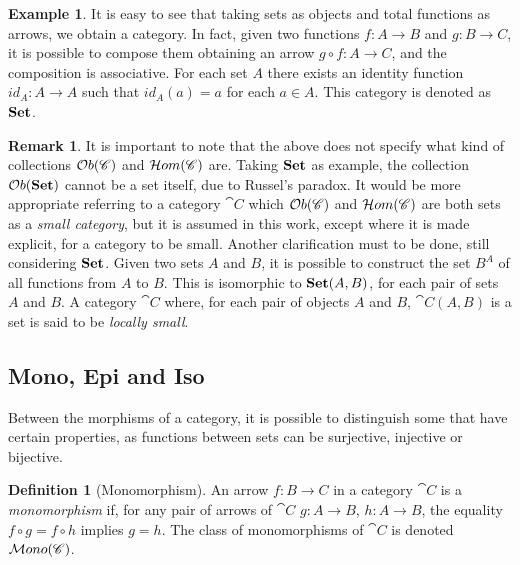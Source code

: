 \documentclass[a4paper, twoside,openright]{report}
\theoremstyle{plain}
\theoremstyle{definition}
\newtheorem{definition}[theorem]{Definition}
\newtheorem{example}[theorem]{Example}
\newtheorem{remark}[theorem]{Remark}
\begin{document}
\begin{example}
    It is easy to see that taking sets as objects and total functions as arrows, we obtain a category. In fact, given two functions $f: A \rightarrow B$ and $g: B \rightarrow C$, it is possible to compose them obtaining an arrow $g \circ f : A \rightarrow C$, and the composition is associative. For each set $A$ there exists an identity function $id_A: A \rightarrow A$ such that $id_A(a) = a$ for each $a\in A$.
    This category is denoted as $\mathbf{Set}$.
\end{example}

\begin{remark}\label{rem:small_cats}
    It is important to note that the  above does not specify what kind of collections
    $\mathcal{O}b(\mathscr{C})$ and $\mathcal{H}om(\mathscr{C})$ are.
    Taking $\mathbf{Set}$ as example, the collection $\mathcal{O}b(\mathbf{Set})$ cannot be a set itself, due to Russel's paradox. It would be more appropriate referring to a category $\cat{C}$ which $\mathcal{O}b(\mathscr{C})$ and $\mathcal{H}om(\mathscr{C})$ are both sets as a \emph{small category}, but it is assumed in this work, except where it is made explicit, for a category to be small.
    Another clarification must to be done, still considering $\mathbf{Set}$. Given two sets $A$ and $B$, it is possible to construct the set $B^A$ of all functions from $A$ to $B$. This is isomorphic to $\mathbf{Set}(A, B)$, for each pair of sets $A$ and $B$.
    {\color{green}{rivedere}}
    A category $\cat C$ where, for each pair of objects $A$ and $B$, $\cat C (A, B)$ is a set is said to be \emph{locally small}.
\end{remark}

\subsection{Mono, Epi and Iso}\label{ssect:Mono_epi_iso}

Between the morphisms of a category, it is possible to distinguish some that have certain properties, as functions between sets can be surjective, injective or bijective.

\begin{definition}[Monomorphism]\label{def:mono}
    An arrow $f:B\rightarrow C$ in a category $\cat{C}$ is a \emph{monomorphism} if, for any pair of arrows of $\cat{C}$ $g:A \rightarrow B$, $h: A \rightarrow B$, the equality $f \circ g = f \circ h$ implies $g = h$. The class of monomorphisms of $\cat C$ is denoted $\mathcal{M}ono(\mathscr{C})$.
\end{definition}
\end{document}
